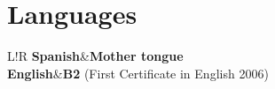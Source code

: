\documentclass[10pt]{article}
\newcommand\VRule{\color{lightgray}\vrule width 0.5pt}
\begin{document}

\section*{Languages}

\begin{tabular}{L!{\VRule}R}
{\bf Spanish}&{\bf Mother tongue}\\
{\bf English}&{\bf B2} (First Certificate in English 2006)\\
\end{tabular}
\end{document}

